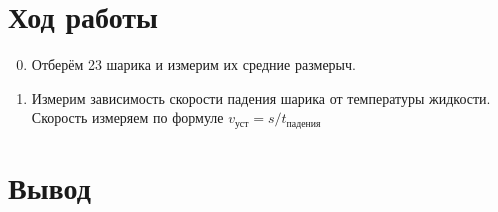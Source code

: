 \documentclass[11pt,a4paper]{article}
\begin{document}
\section*{Ход работы}
\begin{enumerate}
  \setcounter{enumi}{-1}
  \item Отберём 23 шарика и измерим их средние размерыч.
  \item Измерим зависимость скорости падения шарика от температуры жидкости.
  Скорость измеряем по формуле $v_\text{уст} = s / t_\text{падения}$
  
\end{enumerate}

\section*{Вывод}
\end{document}
